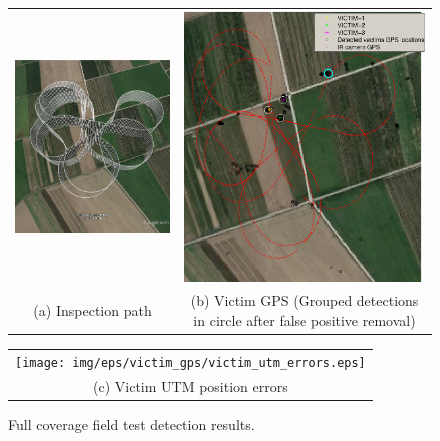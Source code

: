 \documentclass[runningheads]{llncs}
\begin{document}
\begin{figure}
  \centering
  \begin{tabular}{cc}
    \hspace{-1cm}
    \includegraphics[width=7cm]{img/eps/victim_gps/SIP.eps} &
    \includegraphics[width=7cm]{img/eps/victim_gps/SIP_detections_map.eps} \\
    \small (a) Inspection path & 
    \small (b) Victim GPS \tiny (Grouped detections in circle after false positive removal)
  \end{tabular}

  \vspace{\floatsep}
  
  \begin{tabular}{c}
    \texttt{[image: img/eps/victim\_gps/victim\_utm\_errors.eps]} \\
    \small (c) Victim UTM position errors
  \end{tabular}

  \caption{Full coverage field test detection results.}\label{fig:victim_gps}
\end{figure}
\end{document}
